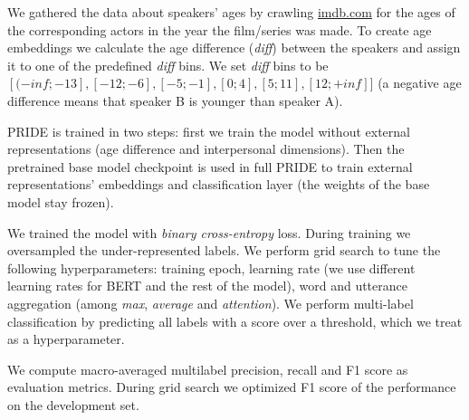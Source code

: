 We gathered the data about speakers' ages by crawling \url{imdb.com} for the ages of the corresponding actors in the year the film/series was made. To create age embeddings we calculate the age difference (\emph{diff}) between the speakers and assign it to one of the predefined \emph{diff} bins. We set \emph{diff} bins to be $[(-inf; -13], [-12; -6], [-5; -1], [0; 4], [5; 11], [12; +inf]]$ (a negative age difference means that speaker B is younger than speaker A).

 PRIDE is trained in two steps: first we train the model without external representations (age difference and interpersonal dimensions). Then the pretrained base model checkpoint is used in full PRIDE to train external representations' embeddings and classification layer (the weights of the base model stay frozen).

We trained the model with \textit{binary cross-entropy} loss. During training we oversampled the under-represented labels. We perform grid search to tune the following hyperparameters: training epoch, learning rate (we use different learning rates for BERT and the rest of the model), word and utterance aggregation (among \textit{max}, \textit{average} and \textit{attention}).
We perform multi-label classification by predicting all labels with a score over a threshold, which we treat as a hyperparameter.

 We compute macro-averaged multilabel precision, recall and F1 score as evaluation metrics. During grid search we optimized F1 score of the performance on the development set.

